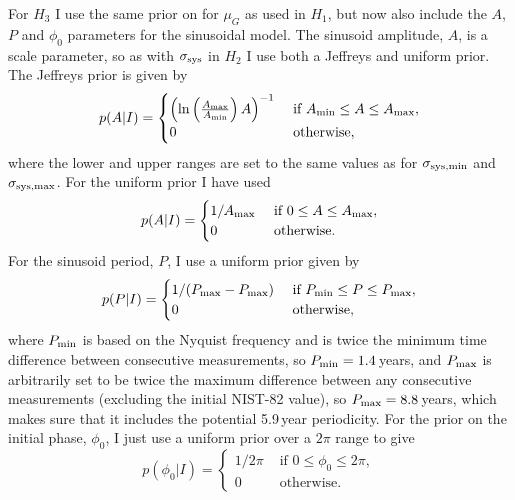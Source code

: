 \documentclass[page-classic]{epl2}
\begin{document}
For $H_3$ I use the same prior on for $\mu_G$ as used in $H_1$, but now also include the $A$, $P$ and
$\phi_0$ parameters for the sinusoidal model. The sinusoid amplitude, $A$, is a scale parameter, so as with
$\sigma_{\rm sys}$ in $H_2$ I use both a Jeffreys and uniform prior. The Jeffreys prior is given by
\begin{equation}
 p(A|I) = \begin{cases}
               \left(\ln{\left( \frac{A_{\rm max}}{A_{\rm min}} \right)A }\right)^{-1}&\text{ if }A_{\rm min} \leq A \leq A_{\rm max}, \\
               0&\text{ otherwise},
          \end{cases}
\end{equation}
where the lower and upper ranges are set to the same values as for $\sigma_{\rm sys,min}$ and $\sigma_{\rm sys,max}$.
For the uniform prior I have used
\begin{equation}
 p(A|I) = \begin{cases}
               1/A_{\rm max}&\text{ if }0 \leq A \leq A_{\rm max}, \\
               0&\text{ otherwise}.
              \end{cases}
\end{equation}
For the sinusoid period, $P$, I use a uniform prior given by
\begin{equation}
 p(P|I) = \begin{cases}
               1/(P_{\rm max}-P_{\rm max})&\text{ if }P_{\rm min} \leq P \leq P_{\rm max}, \\
               0&\text{ otherwise},
              \end{cases}
\end{equation}
where $P_{\rm min}$ is based on the Nyquist frequency and is twice the minimum time difference between
consecutive measurements, so $P_{\rm min} = 1.4$\,years, and $P_{\rm max}$ is arbitrarily set to be twice
the maximum difference between any consecutive measurements (excluding the initial NIST-82 value), so
$P_{\rm max} = 8.8$\,years, which makes sure that it includes the potential 5.9\,year periodicity. For the
prior on the initial phase, $\phi_0$, I just use a uniform prior over a $2\pi$ range to give
\begin{equation}
 p(\phi_0|I) = \begin{cases}
               1/2\pi&\text{ if }0 \leq \phi_0 \leq 2\pi, \\
               0&\text{ otherwise}.
              \end{cases}
\end{equation}
\end{document}

